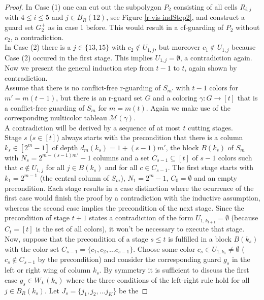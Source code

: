 \documentclass[a4paper,USenglish,numberwithinsect]{lipics}
\theoremstyle{plain}
\begin{document}
\begin{proof}
In Case (1) one can cut out the subpolygon $P_2$ consisting of all cells $R_{i,j}$
with $4 \leq i \leq 5$ and $j \in B_R(12)$, see Figure \ref{r-vis-indStep2}, and construct 
a guard set $G_2^+$ as in case 1 before. This would result in a cf-guarding of $P_2$ without $c_2$,
a contradiction. 
\\
In  Case (2) there is a $j \in \{13,15\}$  with  $c_2 \not \in U_{1,j}$, but moreover 
$c_1 \not \in  U_{1,j}$ because Case (2) occured in the first stage. This implies $U_{1,j}= \emptyset$,
a contradiction again.
\\
Now we present the  general induction step from $t-1$ to $t$, again shown by contradiction. \\
Assume  that  there is
no conflict-free r-guarding of $S_{m'}$ with
$t-1$ colors for $m'=m(t-1)$, but there  is an r-guard set $G$ and a
coloring $\gamma: G \rightarrow [t]$ that is a conflict-free guarding of $S_{m}$
for $m=m(t)$. Again we make use of the corresponding  multicolor tableau
$\mathcal{M}(\gamma)$. \\
A contradiction will be derived by  a sequence of at most $t$
cutting stages. \\
Stage $s$ ($s \in [t]$)  always starts with the precondition that 
there is a column $k_s \in [2^m-1]$ of depth $d_m(k_s)=1+(s-1)m'$,
the block $B(k_s)$ of $S_m$ with $N_s= 2^{m-(s-1)m'}-1$ 
columns and a set $C_{s-1} \subseteq [t]$ of $s-1$ colors such that 
$c \not \in U_{1,j}$ for all $j \in B(k_s)$ and for  all $c \in C_{s-1}$.
The first stage starts with $k_1=2^{m-1}$ (the central column of $S_m$),
$N_1=2^m-1$, $C_0 = \emptyset$ and an empty precondition.
Each stage results in a case distinction where the ocurrence of the first case
would finish the proof by a contradiction with the inductive assumption,
whereas the second case implies  the precondition of the next stage.
Since the precondition of  stage $t+1$ states a contradiction of the form $U_{1,k_{t+1}} = \emptyset$ 
(because $C_{t}=[t]$ is the set of all colors), it  won't be necessary to execute that stage. 
\\
Now, suppose that the precondition of a stage $s \leq t$ is fulfilled in a block $B(k_s)$
with the color set $C_{s-1}=\{c_1,c_2, \ldots c_{s-1}\}$. Choose some color
$c_s \in U_{1,k_s} \not= \emptyset$ ($c_s \not \in C_{s-1}$ by the  precondition)
and consider  the corresponding guard $g_s$ in the left or 
right wing of column $k_s$. By symmetry it is sufficient to discuss the 
first case $g_s \in W_L(k_s)$ where the three conditions of the left-right rule
hold for all $j \in B_R(k_s)$. Let $J_s=\{j_1,j_2, \dots j_K\}$ be the 

\end{proof}
\end{document}

